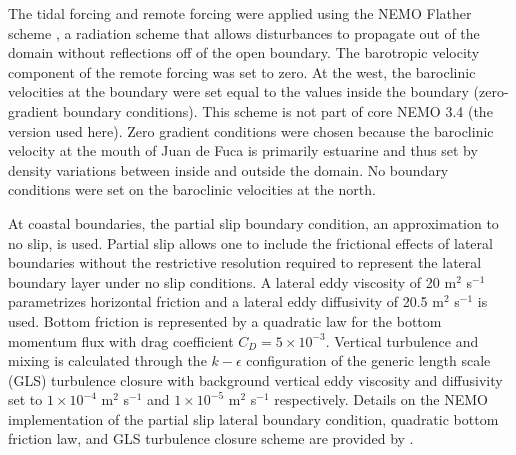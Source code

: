 \documentclass[letterpaper]{tATO2e}
\begin{document}
The tidal forcing and remote forcing were applied using the NEMO Flather scheme \citep{flather1994storm, madec2012nemo}, a radiation scheme that allows disturbances to propagate out of the domain without reflections off of the open boundary. The barotropic velocity component of the remote forcing was set to zero. At the west, the baroclinic velocities at the boundary were set equal to the values inside the boundary (zero-gradient boundary conditions).  This scheme is not part of core NEMO 3.4 (the version used here).  Zero gradient conditions were chosen because the baroclinic velocity at the mouth of Juan de Fuca is primarily estuarine and thus set by density variations between inside and outside the domain. {\color{red} No boundary conditions were set on the baroclinic velocities at the north.} 

At coastal boundaries, the partial slip boundary condition, an approximation to no slip, is used. Partial slip allows one to include the frictional effects of lateral boundaries without the restrictive resolution required to represent the lateral boundary layer under no slip conditions. A lateral eddy viscosity of 20 m$^2$ s$^{-1}$ parametrizes horizontal friction and a lateral eddy diffusivity of 20.5 m$^2$ s$^{-1}$ is used.  Bottom friction is represented by a quadratic law for the bottom momentum flux with drag coefficient $C_D = 5\times 10^{-3}$. Vertical turbulence and mixing is calculated through the $k-\epsilon$ configuration of the generic length scale (GLS) turbulence closure \citep{umlauf2003generic} with background vertical eddy viscosity and diffusivity set to $1\times10^{-4}$ m$^2$ s$^{-1}$ and $1\times10^{-5}$ m$^2$ s$^{-1}$ respectively. Details on the NEMO implementation of the partial slip lateral boundary condition, quadratic bottom friction law, and GLS turbulence closure scheme are provided by \citet{madec2012nemo}.
\end{document}
